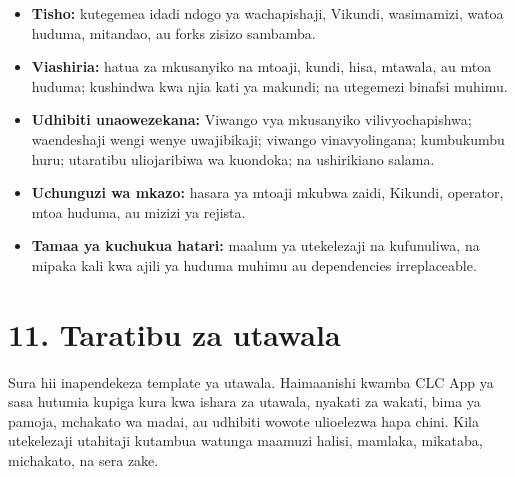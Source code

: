 \documentclass[11pt]{article}
\begin{document}
\begin{itemize}[leftmargin=*]
\item \textbf{Tisho:} kutegemea idadi ndogo ya wachapishaji, Vikundi, wasimamizi, watoa huduma, mitandao, au forks zisizo sambamba.
\item \textbf{Viashiria:} hatua za mkusanyiko na mtoaji, kundi, hisa, mtawala, au mtoa huduma; kushindwa kwa njia kati ya makundi; na utegemezi binafsi muhimu.
\item \textbf{Udhibiti unaowezekana:} Viwango vya mkusanyiko vilivyochapishwa; waendeshaji wengi wenye uwajibikaji; viwango vinavyolingana; kumbukumbu huru; utaratibu uliojaribiwa wa kuondoka; na ushirikiano salama.
\item \textbf{Uchunguzi wa mkazo:} hasara ya mtoaji mkubwa zaidi, Kikundi, operator, mtoa huduma, au mizizi ya rejista.
\item \textbf{Tamaa ya kuchukua hatari:} maalum ya utekelezaji na kufunuliwa, na mipaka kali kwa ajili ya huduma muhimu au dependencies irreplaceable.
\end{itemize}

\section*{11. Taratibu za utawala}

Sura hii inapendekeza template ya utawala. Haimaanishi kwamba CLC App ya sasa hutumia kupiga kura kwa ishara za utawala, nyakati za wakati, bima ya pamoja, mchakato wa madai, au udhibiti wowote ulioelezwa hapa chini. Kila utekelezaji utahitaji kutambua watunga maamuzi halisi, mamlaka, mikataba, michakato, na sera zake.
\end{document}
